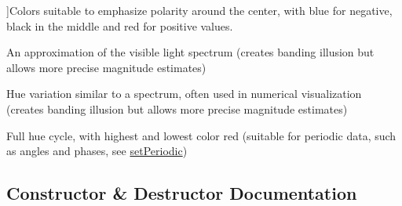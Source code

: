 \begin{Desc}
\begin{description}
{}]Colors suitable to emphasize polarity around the center, with blue for negative, black in the middle and red for positive values. \item[{\em 
gp\+Spectrum\hypertarget{classQCPColorGradient_aed6569828fee337023670272910c9072ad63adc100ef46f6b4a8a6deacec4642f}{}\label{classQCPColorGradient_aed6569828fee337023670272910c9072ad63adc100ef46f6b4a8a6deacec4642f}
}]An approximation of the visible light spectrum (creates banding illusion but allows more precise magnitude estimates) \item[{\em 
gp\+Jet\hypertarget{classQCPColorGradient_aed6569828fee337023670272910c9072a5f8a9e67b64c17ddfe4f069fe2b9fb02}{}\label{classQCPColorGradient_aed6569828fee337023670272910c9072a5f8a9e67b64c17ddfe4f069fe2b9fb02}
}]Hue variation similar to a spectrum, often used in numerical visualization (creates banding illusion but allows more precise magnitude estimates) \item[{\em 
gp\+Hues\hypertarget{classQCPColorGradient_aed6569828fee337023670272910c9072a30efe58407acfb67939032f70213a130}{}\label{classQCPColorGradient_aed6569828fee337023670272910c9072a30efe58407acfb67939032f70213a130}
}]Full hue cycle, with highest and lowest color red (suitable for periodic data, such as angles and phases, see \hyperlink{classQCPColorGradient_a39d6448155fc00a219f239220d14bb39}{set\+Periodic}) \end{description}
\end{Desc}


\subsection{Constructor \& Destructor Documentation}
